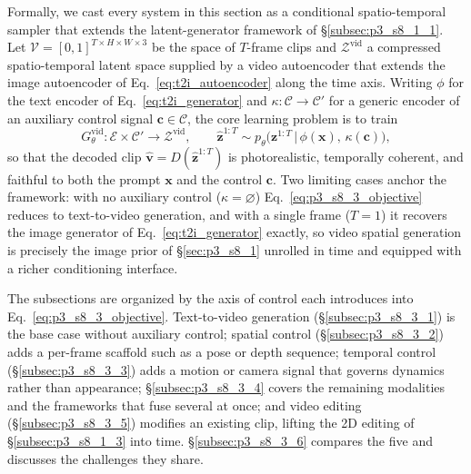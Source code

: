 Formally, we cast every system in this section as a conditional spatio-temporal sampler that extends the latent-generator framework of §\ref{subsec:p3_s8_1_1}.
Let $\mathcal{V}=[0,1]^{T\times H\times W\times 3}$ be the space of $T$-frame clips and $\mathcal{Z}^{\text{vid}}$ a compressed spatio-temporal latent space supplied by a video autoencoder that extends the image autoencoder of Eq.~\eqref{eq:t2i_autoencoder} along the time axis.
Writing $\phi$ for the text encoder of Eq.~\eqref{eq:t2i_generator} and $\kappa:\mathcal{C}\!\to\!\mathcal{C}'$ for a generic encoder of an auxiliary control signal $\mathbf{c}\in\mathcal{C}$, the core learning problem is to train
\begin{equation}
G_\theta^{\text{vid}}:\mathcal{E}\times\mathcal{C}'\rightarrow\mathcal{Z}^{\text{vid}},\qquad
\hat{\mathbf{z}}^{1:T}\sim p_\theta\!\big(\mathbf{z}^{1:T}\,\big|\,\phi(\mathbf{x}),\,\kappa(\mathbf{c})\big),
\label{eq:p3_s8_3_objective}
\end{equation}
so that the decoded clip $\hat{\mathbf{v}}=D(\hat{\mathbf{z}}^{1:T})$ is photorealistic, temporally coherent, and faithful to both the prompt $\mathbf{x}$ and the control $\mathbf{c}$.
Two limiting cases anchor the framework: with no auxiliary control ($\kappa=\varnothing$) Eq.~\eqref{eq:p3_s8_3_objective} reduces to text-to-video generation, and with a single frame ($T=1$) it recovers the image generator of Eq.~\eqref{eq:t2i_generator} exactly, so video spatial generation is precisely the image prior of §\ref{sec:p3_s8_1} unrolled in time and equipped with a richer conditioning interface.

The subsections are organized by the axis of control each introduces into Eq.~\eqref{eq:p3_s8_3_objective}.
Text-to-video generation (§\ref{subsec:p3_s8_3_1}) is the base case without auxiliary control; spatial control (§\ref{subsec:p3_s8_3_2}) adds a per-frame scaffold such as a pose or depth sequence; temporal control (§\ref{subsec:p3_s8_3_3}) adds a motion or camera signal that governs dynamics rather than appearance; §\ref{subsec:p3_s8_3_4} covers the remaining modalities and the frameworks that fuse several at once; and video editing (§\ref{subsec:p3_s8_3_5}) modifies an existing clip, lifting the 2D editing of §\ref{subsec:p3_s8_1_3} into time.
§\ref{subsec:p3_s8_3_6} compares the five and discusses the challenges they share.







